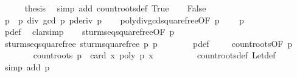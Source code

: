 \begin{isabellebody}
\ \ \ \ \isamarkupfalse%
\ {\isacharquery}thesis\ \isamarkupfalse%
\ {\isacharparenleft}simp\ add{\isacharcolon}\ count{\isacharunderscore}roots{\isacharunderscore}def\ True{\isacharparenright}\isanewline
{}\isamarkupfalse%
\isanewline
\ \ \isamarkupfalse%
\ False\isanewline
\ \ \isamarkupfalse%
\ p{\isacharprime}\ {\isasymequiv}\ {\isachardoublequoteopen}p\ div\ {\isacharparenleft}gcd\ p\ {\isacharparenleft}pderiv\ p{\isacharparenright}{\isacharparenright}{\isachardoublequoteclose}\isanewline
\ \ \isamarkupfalse%
\ poly{\isacharunderscore}div{\isacharunderscore}gcd{\isacharunderscore}squarefree{\isacharparenleft}{}{\isacharparenright}{\isacharbrackleft}OF\ {\isacharbackquoteopen}p\ {\isasymnoteq}\ {}{\isacharbackquoteclose}{\isacharbrackright}\ \isamarkupfalse%
\ {\isachardoublequoteopen}p{\isacharprime}\ {\isasymnoteq}\ {}{\isachardoublequoteclose}\isanewline
\ \ \ \ \ \ \isamarkupfalse%
\ p{\isacharprime}{\isacharunderscore}def\ \isamarkupfalse%
\ clarsimp\isanewline
\isanewline
\ \ \isamarkupfalse%
\ sturm{\isacharunderscore}seq{\isacharunderscore}squarefree{\isacharbrackleft}OF\ {\isacharbackquoteopen}p\ {\isasymnoteq}\ {}{\isacharbackquoteclose}{\isacharbrackright}\isanewline
\ \ \ \ \ \ \isamarkupfalse%
\ sturm{\isacharunderscore}seq{\isacharunderscore}squarefree\ {\isachardoublequoteopen}sturm{\isacharunderscore}squarefree\ p{\isachardoublequoteclose}\ p{\isacharprime}\isanewline
\ \ \ \ \ \ \isamarkupfalse%
\ p{\isacharprime}{\isacharunderscore}def\ \isacommand{{\isachardot}}\isamarkupfalse%
\isanewline
\ \ \isamarkupfalse%
\ count{\isacharunderscore}roots{\isacharbrackleft}OF\ {\isacharbackquoteopen}p{\isacharprime}\ {\isasymnoteq}\ {}{\isacharbackquoteclose}{\isacharbrackright}\isanewline
\ \ \ \ \ \ \isamarkupfalse%
\ {\isachardoublequoteopen}count{\isacharunderscore}roots\ p\ {\isacharequal}\ card\ {\isacharbraceleft}x{\isachardot}\ poly\ p{\isacharprime}\ x\ {\isacharequal}\ {}{\isacharbraceright}{\isachardoublequoteclose}\isanewline
\ \ \ \ \ \ \isamarkupfalse%
\ count{\isacharunderscore}roots{\isacharunderscore}def\ Let{\isacharunderscore}def\ \isamarkupfalse%
\ {\isacharparenleft}simp\ add{\isacharcolon}\ {\isacharbackquoteopen}p\ {\isasymnoteq}\ {}{\isacharbackquoteclose}{\isacharparenright}\isanewline

\end{isabellebody}
